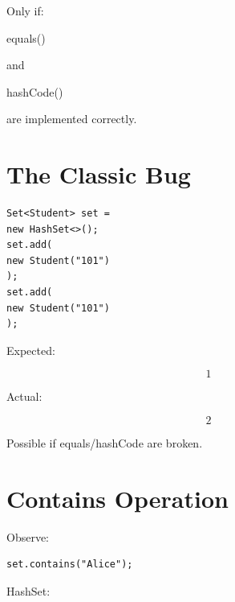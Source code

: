 \documentclass[11pt,a4paper]{book}
\begin{document}
Only if:


equals()


and


hashCode()


are implemented correctly.


\section{The Classic Bug}

\begin{verbatim} 
Set<Student> set =
new HashSet<>();
set.add(
new Student("101")
);
set.add(
new Student("101")
);
\end{verbatim}


Expected:

\[
1
\]


Actual:

\[
2
\]


Possible if equals/hashCode
are broken.


\section{Contains Operation}

Observe:

\begin{verbatim} 
set.contains("Alice");
\end{verbatim}


HashSet:

\end{document}

